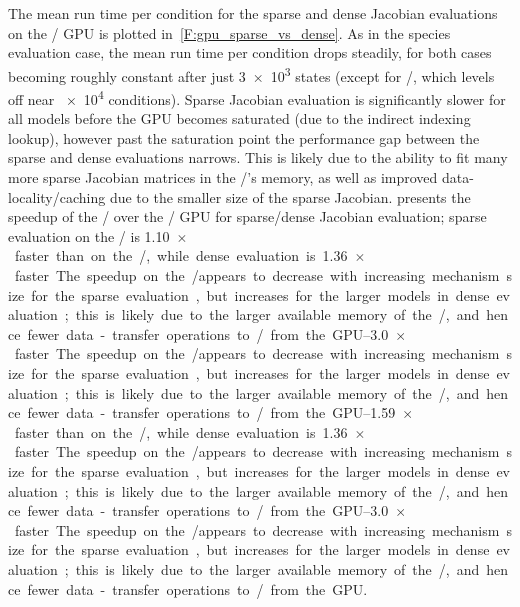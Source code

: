 \documentclass[12pt,number,sort&compress,preprint]{elsarticle}
\begin{document}
The mean run time per condition for the sparse and dense Jacobian evaluations on the \gpunew/ GPU is plotted in~\cref{F:gpu_sparse_vs_dense}.
As in the species evaluation case, the mean run time per condition drops steadily, for both cases becoming roughly constant after just \num{3e3} states (except for \slash{}, which levels off near \num{e4} conditions).
Sparse Jacobian evaluation is significantly slower for all models before the GPU becomes saturated (due to the indirect indexing lookup), however past the saturation point the performance gap between the sparse and dense evaluations narrows.
This is likely due to the ability to fit many more sparse Jacobian matrices in the \gpunew/'s memory, as well as improved data-locality\slash caching due to the smaller size of the sparse Jacobian.
 presents the speedup of the \gpunew/ over the \gpuold/ GPU for sparse\slash dense Jacobian evaluation; sparse evaluation on the \gpunew/ is \SIrange{1.10}{1.59}{$\times$} faster than on the \gpuold/, while dense evaluation is \SIrange{1.36}{3.0}{$\times$} faster.
The speedup on the \gpunew/ appears to decrease with increasing mechanism size for the sparse evaluation, but increases for the larger models in dense evaluation; this is likely due to the larger available memory of the \gpunew/, and hence fewer data-transfer operations to\slash from the GPU.
\end{document}
